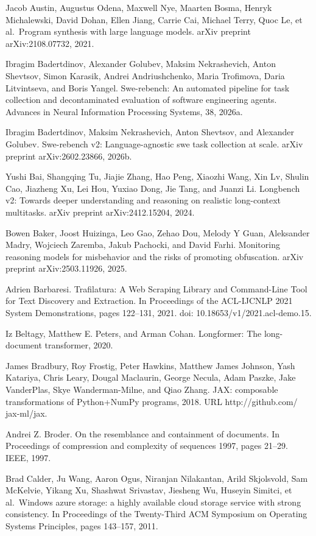 Jacob Austin, Augustus Odena, Maxwell Nye, Maarten Bosma, Henryk
Michalewski, David Dohan, Ellen Jiang, Carrie Cai, Michael Terry, Quoc
Le, et al.~Program synthesis with large language models. arXiv preprint
arXiv:2108.07732, 2021.

Ibragim Badertdinov, Alexander Golubev, Maksim Nekrashevich, Anton
Shevtsov, Simon Karasik, Andrei Andriushchenko, Maria Trofimova, Daria
Litvintseva, and Boris Yangel. Swe-rebench: An automated pipeline for
task collection and decontaminated evaluation of software engineering
agents. Advances in Neural Information Processing Systems, 38, 2026a.

Ibragim Badertdinov, Maksim Nekrashevich, Anton Shevtsov, and Alexander
Golubev. Swe-rebench v2: Language-agnostic swe task collection at scale.
arXiv preprint arXiv:2602.23866, 2026b.

Yushi Bai, Shangqing Tu, Jiajie Zhang, Hao Peng, Xiaozhi Wang, Xin Lv,
Shulin Cao, Jiazheng Xu, Lei Hou, Yuxiao Dong, Jie Tang, and Juanzi Li.
Longbench v2: Towards deeper understanding and reasoning on realistic
long-context multitasks. arXiv preprint arXiv:2412.15204, 2024.

Bowen Baker, Joost Huizinga, Leo Gao, Zehao Dou, Melody Y Guan,
Aleksander Madry, Wojciech Zaremba, Jakub Pachocki, and David Farhi.
Monitoring reasoning models for misbehavior and the risks of promoting
obfuscation. arXiv preprint arXiv:2503.11926, 2025.

Adrien Barbaresi. Trafilatura: A Web Scraping Library and Command-Line
Tool for Text Discovery and Extraction. In Proceedings of the ACL-IJCNLP
2021 System Demonstrations, pages 122--131, 2021. doi:
10.18653/v1/2021.acl-demo.15.

Iz Beltagy, Matthew E. Peters, and Arman Cohan. Longformer: The
long-document transformer, 2020.

James Bradbury, Roy Frostig, Peter Hawkins, Matthew James Johnson, Yash
Katariya, Chris Leary, Dougal Maclaurin, George Necula, Adam Paszke,
Jake VanderPlas, Skye Wanderman-Milne, and Qiao Zhang. JAX: composable
transformations of Python+NumPy programs, 2018. URL http://github.com/
jax-ml/jax.

Andrei Z. Broder. On the resemblance and containment of documents. In
Proceedings of compression and complexity of sequences 1997, pages
21--29. IEEE, 1997.

Brad Calder, Ju Wang, Aaron Ogus, Niranjan Nilakantan, Arild Skjolsvold,
Sam McKelvie, Yikang Xu, Shashwat Srivastav, Jiesheng Wu, Huseyin
Simitci, et al.~Windows azure storage: a highly available cloud storage
service with strong consistency. In Proceedings of the Twenty-Third ACM
Symposium on Operating Systems Principles, pages 143--157, 2011.



